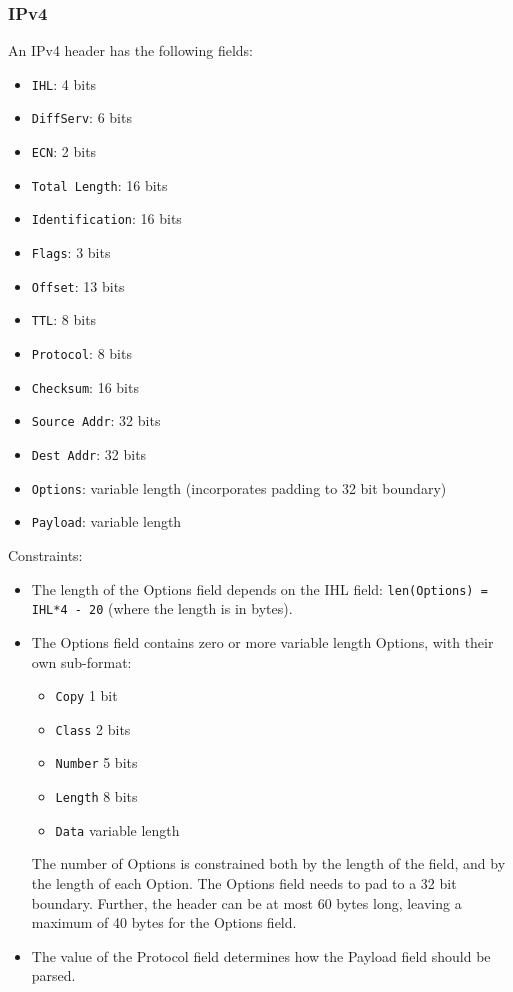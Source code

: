 \documentclass[10pt,a4paper]{article}
\begin{document}
\subsubsection*{IPv4}

An IPv4 header has the following fields:
\begin{itemize}
\item \texttt{IHL}: 4 bits
\item \texttt{DiffServ}: 6 bits
\item \texttt{ECN}: 2 bits
\item \texttt{Total Length}: 16 bits
\item \texttt{Identification}: 16 bits
\item \texttt{Flags}: 3 bits
\item \texttt{Offset}: 13 bits
\item \texttt{TTL}: 8 bits
\item \texttt{Protocol}: 8 bits
\item \texttt{Checksum}: 16 bits
\item \texttt{Source Addr}: 32 bits
\item \texttt{Dest Addr}: 32 bits
\item \texttt{Options}: variable length (incorporates padding to 32 bit boundary)
\item \texttt{Payload}: variable length
\end{itemize}

Constraints:
\begin{itemize}
\item The length of the Options field depends on the IHL field:
\texttt{len(Options) = IHL*4 - 20} (where the length is in bytes).
\item The Options field contains zero or more variable length Options, with their own
sub-format:
\begin{itemize}
\item \texttt{Copy} 1 bit
\item \texttt{Class} 2 bits
\item \texttt{Number} 5 bits
\item \texttt{Length} 8 bits
\item \texttt{Data} variable length
\end{itemize}
The number of Options is constrained both by the length of the field, and by the length
of each Option. The Options field needs to pad to a 32 bit boundary. Further, the
header can be at most 60 bytes long, leaving a maximum of 40 bytes for the Options field.
\item The value of the Protocol field determines how the Payload field should be parsed.
\end{itemize}
\end{document}
